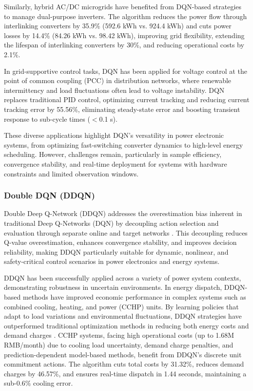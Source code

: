 Similarly, hybrid AC/DC microgrids have benefited from DQN-based strategies to manage dual-purpose inverters. The algorithm reduces the power flow through interlinking converters by 35.9\% (592.6 kWh vs. 924.4 kWh) and cuts power losses by 14.4\% (84.26 kWh vs. 98.42 kWh), improving grid flexibility, extending the lifespan of interlinking converters by 30\%, and reducing operational costs by 2.1\%.

In grid-supportive control tasks, DQN has been applied for voltage control at the point of common coupling (PCC) in distribution networks, where renewable intermittency and load fluctuations often lead to voltage instability. DQN replaces traditional PID control, optimizing current tracking and reducing current tracking error by 55.56\%, eliminating steady-state error and boosting transient response to sub-cycle times ($<$0.1 s).

These diverse applications highlight DQN’s versatility in power electronic systems, from optimizing fast-switching converter dynamics to high-level energy scheduling. However, challenges remain, particularly in sample efficiency, convergence stability, and real-time deployment for systems with hardware constraints and limited observation windows.

\subsubsection{Double DQN (DDQN)}  

Double Deep Q-Network (DDQN) addresses the overestimation bias inherent in traditional Deep Q-Networks (DQN) by decoupling action selection and evaluation through separate online and target networks \cite{wang2016dueling}. This decoupling reduces Q-value overestimation, enhances convergence stability, and improves decision reliability, making DDQN particularly suitable for dynamic, nonlinear, and safety-critical control scenarios in power electronics and energy systems.

DDQN has been successfully applied across a variety of power system contexts, demonstrating robustness in uncertain environments. In energy dispatch, DDQN-based methods have improved economic performance in complex systems such as combined cooling, heating, and power (CCHP) units. By learning policies that adapt to load variations and environmental fluctuations, DDQN strategies have outperformed traditional optimization methods in reducing both energy costs and demand charges \cite{gao2023energy}. CCHP systems, facing high operational costs (up to 1.68M RMB/month) due to cooling load uncertainty, demand charge penalties, and prediction-dependent model-based methods, benefit from DDQN's discrete unit commitment actions. The algorithm cuts total costs by 31.32\%, reduces demand charges by 46.57\%, and ensures real-time dispatch in 1.44 seconds, maintaining a sub-0.6\% cooling error.

